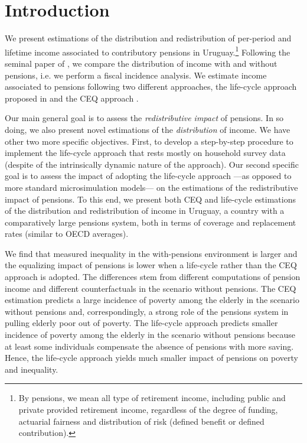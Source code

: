 \documentclass{article}
\begin{document}
%


\section{Introduction}

We present estimations of the distribution and redistribution of per-period and lifetime income associated to contributory pensions in Uruguay.\footnote{By pensions, we mean all type of retirement income, including public and private provided retirement income, regardless of the degree of funding, actuarial fairness and distribution of risk (defined benefit or defined contribution).} Following the seminal paper of \textcite{Musgrave1948}, we compare the distribution of income with and without pensions, i.e. we perform a fiscal incidence analysis. We estimate income associated to pensions following two different approaches, the life-cycle approach proposed in \textcite{Forteza2023} and the CEQ approach \parencite{Lustig2022a, Lustig2022b}.

Our main general goal is to assess the \textit{redistributive impact} of pensions. In so doing, we also present novel estimations of the \textit{distribution} of income. We have other two more specific objectives. First, to develop a step-by-step procedure to implement the life-cycle approach that rests mostly on household survey data (despite of the intrinsically dynamic nature of the approach). Our second specific goal is to assess the impact of adopting the life-cycle approach ---as opposed to more standard microsimulation models--- on the estimations of the redistributive impact of pensions. To this end, we present both CEQ and life-cycle estimations of the distribution and redistribution of income in Uruguay, a country with a comparatively large pensions system, both in terms of coverage and replacement rates (similar to OECD averages).     

We find that measured inequality in the with-pensions environment is larger and the equalizing impact of pensions is lower when a life-cycle rather than the CEQ approach is adopted. The differences stem from different computations of pension income and different counterfactuals in the scenario without pensions. The CEQ estimation predicts a large incidence of poverty among the elderly in the scenario without pensions and, correspondingly, a strong role of the pensions system in pulling elderly poor out of poverty. The life-cycle approach predicts smaller incidence of poverty among the elderly in the scenario without pensions because at least some individuals compensate the absence of pensions with more saving. Hence, the life-cycle approach yields much smaller impact of pensions on poverty and inequality.
\end{document}

